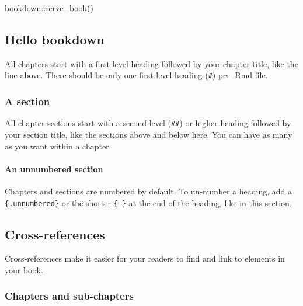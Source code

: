 \documentclass[
]{bxjsbook}
\newenvironment{Shaded}{\begin{snugshade}}{\end{snugshade}}
\newcommand{\FunctionTok}[1]{\textcolor[rgb]{0.00,0.00,0.00}{#1}}
\newcommand{\NormalTok}[1]{#1}
\newcommand{\SpecialCharTok}[1]{\textcolor[rgb]{0.00,0.00,0.00}{#1}}
\theoremstyle{definition}
\theoremstyle{definition}
\theoremstyle{definition}
\theoremstyle{definition}
\theoremstyle{remark}
\begin{document}
\begin{Shaded}
\begin{Highlighting}[]
\NormalTok{bookdown}\SpecialCharTok{::}\FunctionTok{serve\_book}\NormalTok{()}
\end{Highlighting}
\end{Shaded}

\hypertarget{hello-bookdown}{%
\subsection{Hello bookdown}\label{hello-bookdown}}

All chapters start with a first-level heading followed by your chapter title, like the line above. There should be only one first-level heading (\texttt{\#}) per .Rmd file.

\hypertarget{a-section}{%
\subsubsection{A section}\label{a-section}}

All chapter sections start with a second-level (\texttt{\#\#}) or higher heading followed by your section title, like the sections above and below here. You can have as many as you want within a chapter.

\hypertarget{an-unnumbered-section}{%
\paragraph*{An unnumbered section}\label{an-unnumbered-section}}

Chapters and sections are numbered by default. To un-number a heading, add a \texttt{\{.unnumbered\}} or the shorter \texttt{\{-\}} at the end of the heading, like in this section.

\hypertarget{cross}{%
\subsection{Cross-references}\label{cross}}

Cross-references make it easier for your readers to find and link to elements in your book.

\hypertarget{chapters-and-sub-chapters}{%
\subsubsection{Chapters and sub-chapters}\label{chapters-and-sub-chapters}}
\end{document}
